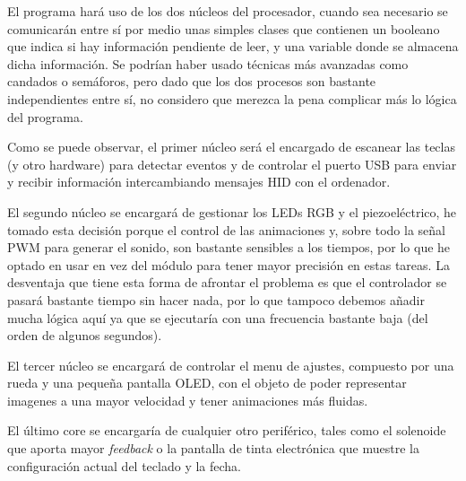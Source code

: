 El programa hará uso de los dos núcleos del procesador, cuando sea necesario se comunicarán entre sí por medio unas simples clases que contienen un booleano que indica si hay información pendiente de leer, y una variable donde se almacena dicha información. Se podrían haber usado técnicas más avanzadas como candados o semáforos, pero dado que los dos procesos son bastante independientes entre sí, no considero que merezca la pena complicar más lo lógica del programa.



Como se puede observar, el primer núcleo será el encargado de escanear las teclas (y otro hardware) para detectar eventos y de controlar el puerto USB para enviar y recibir información intercambiando mensajes HID con el ordenador. \newline

El segundo núcleo se encargará de gestionar los LEDs RGB y el piezoeléctrico, he tomado esta decisión porque el control de las animaciones y, sobre todo la señal PWM para generar el sonido, son bastante sensibles a los tiempos, por lo que he optado en usar  en vez del módulo  para tener mayor precisión en estas tareas. La desventaja que tiene esta forma de afrontar el problema es que el controlador se pasará bastante tiempo sin hacer nada, por lo que tampoco debemos añadir mucha lógica aquí ya que se ejecutaría con una frecuencia bastante baja (del orden de algunos segundos). \newline

El tercer núcleo se encargará de controlar el menu de ajustes, compuesto por una rueda y una pequeña pantalla OLED, con el objeto de poder representar imagenes a una mayor velocidad y tener animaciones más fluidas. \newline

El último core se encargaría de cualquier otro periférico, tales como el solenoide que aporta mayor \textit{feedback} o la pantalla de tinta electrónica que muestre la configuración actual del teclado y la fecha.
